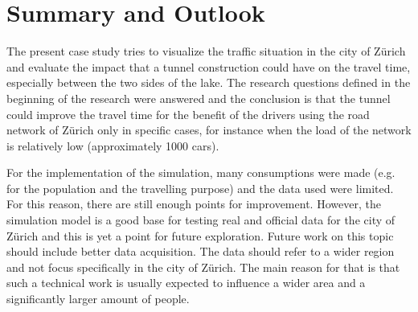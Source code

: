 \documentclass[11pt]{article}
\begin{document}
\section{Summary and Outlook}
The present case study tries to visualize the traffic situation in the city of Z\"urich and evaluate the impact that a tunnel construction could have on the travel time, especially between the two sides of the lake. The research questions defined in the beginning of the research were answered and the conclusion is that the tunnel could improve the travel time for the benefit of the drivers using the road network of Z\"urich only in specific cases, for instance when the load of the network is relatively low (approximately 1000 cars).

For the implementation of the simulation, many consumptions were made (e.g. for the population and the travelling purpose) and the data used were limited. For this reason, there are still enough points for improvement. However, the simulation model is a good base for testing real and official data for the city of Z\"urich and this is yet a point for future exploration. Future work on this topic should include better data acquisition. The data should refer to a wider region and not focus specifically in the city of Z\"urich. The main reason for that is that such a technical work is usually expected to influence a wider area and a significantly larger amount of people.




\newpage
\printbibliography
\end{document}
